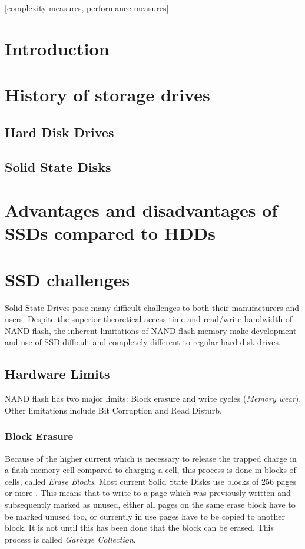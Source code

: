\documentclass{acm_proc_article-sp}
\begin{document}
[complexity measures, performance measures]

\section{Introduction}

\section{History of storage drives}

\subsection{Hard Disk Drives}

\subsection{Solid State Disks}

\section{Advantages and disadvantages of SSDs compared to HDDs}

\section{SSD challenges}
Solid State Drives pose many difficult challenges to both their manufacturers and users. Despite the superior theoretical access time and read/write bandwidth of NAND flash, the inherent limitations of NAND flash memory make development and use of SSD difficult and completely different to regular hard disk drives.

\subsection{Hardware Limits}
NAND flash has two major limits: Block erasure and write cycles (\emph{Memory wear}). Other limitations include Bit Corruption and Read Disturb.

\subsubsection*{Block Erasure}
Because of the higher current which is necessary to release the trapped charge in a flash memory cell compared to charging a cell, this process is done in blocks of cells, called \emph{Erase Blocks}. Most current Solid State Disks use blocks of 256 pages or more \cite{codecapsule2014coding}.
This means that to write to a page which was previously written and subsequently marked as unused, either all pages on the same erase block have to be marked unused too, or currently in use pages have to be copied to another block. It is not until this has been done that the block can be erased. This process is called \emph{Garbage Collection}.
\end{document}
